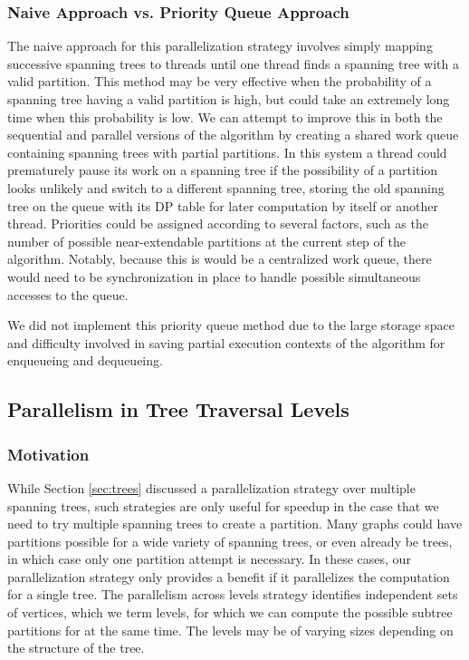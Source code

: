 \documentclass[11pt]{article}
\begin{document}
\subsubsection{Naive Approach vs. Priority Queue Approach}

The naive approach for this parallelization strategy involves simply mapping successive spanning trees to threads until one thread finds a spanning tree with a valid partition.
This method may be very effective when the probability of a spanning tree having a valid partition is high, but could take an extremely long time when this probability is low.
We can attempt to improve this in both the sequential and parallel versions of the algorithm by creating a shared work queue containing spanning trees with partial partitions.
In this system a thread could prematurely pause its work on a spanning tree if the possibility of a partition looks unlikely and switch to a different spanning tree, storing the old spanning tree on the queue with its DP table for later computation by itself or another thread.
Priorities could be assigned according to several factors, such as the number of possible near-extendable partitions at the current step of the algorithm.
Notably, because this is would be a centralized work queue, there would need to be synchronization in place to handle possible simultaneous accesses to the queue.

We did not implement this priority queue method due to the large storage space and difficulty involved in saving partial execution contexts of the algorithm for enqueueing and dequeueing.

\subsection{Parallelism in Tree Traversal Levels}
\label{sec:levels}

\subsubsection{Motivation}

While Section \ref{sec:trees} discussed a parallelization strategy over multiple spanning trees, such strategies are only useful for speedup in the case that we need to try multiple spanning trees to create a partition.
Many graphs could have partitions possible for a wide variety of spanning trees, or even already be trees, in which case only one partition attempt is necessary.
In these cases, our parallelization strategy only provides a benefit if it parallelizes the computation for a single tree.
The parallelism across levels strategy identifies independent sets of vertices, which we term levels, for which we can compute the possible subtree partitions for at the same time.
The levels may be of varying sizes depending on the structure of the tree.
\end{document}
